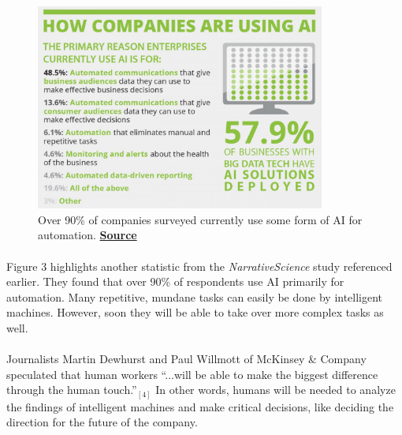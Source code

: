 \documentclass{article}
\begin{document}
      \begin{figure}[ht]
        \centering
        \captionsetup{width=.85\linewidth}
        \includegraphics[width=0.85\textwidth,height=\textheight, keepaspectratio]{Figure3}
        \caption{Over 90\% of companies surveyed currently use some form of AI for automation.
                 \href{http://thumbnails-visually.netdna-ssl.com/artificial-intelligence-is-not-killing-jobs_557b4376e27b8_w1500.jpg}
                 {\textbf{Source}}}
      \end{figure}

    \paragraph{}
      Figure 3 highlights another statistic from the \textit{NarrativeScience}
      study referenced earlier. They found that over 90\% of respondents use AI
      primarily for automation. Many repetitive, mundane tasks can easily be
      done by intelligent machines. However, soon they will be able to take over
      more complex tasks as well.

    \paragraph{}
      Journalists Martin Dewhurst and Paul Willmott of McKinsey \& Company
      speculated that human workers ``...will be able to make the biggest difference
      through the human touch.''$_{[4]}$ In other words, humans will be needed to
      analyze the findings of intelligent machines and make critical
      decisions, like deciding the direction for the future of the company.
\end{document}
